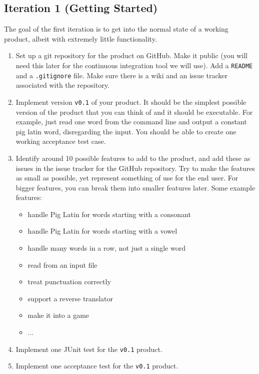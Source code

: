 \documentclass[swedish,english]{article}
\begin{document}
\subsection*{Iteration 1 (Getting Started)}
The goal of the first iteration is to get into the normal state of a working product, albeit with extremely little functionality.

\begin{enumerate}

\item Set up a git repository for the product on GitHub. Make it public (you will need this later for the continuous integration tool we will use). Add a \verb'README' and a \verb'.gitignore' file. Make sure there is a wiki and an issue tracker associated with the repository.

\item Implement version \verb'v0.1' of your product. It should be the simplest possible version of the product that you can think of and it should be executable. For example, just read one word from the command line and output a constant pig latin word, disregarding the input. You should be able to create one working acceptance test case.

\item Identify around 10 possible features to add to the product, and add these as issues in the issue tracker for the GitHub repository. Try to make the features as small as possible, yet represent something of use for the end user. For bigger features, you can break them into smaller features later. Some example features:
\begin{itemize}
\item handle Pig Latin for words starting with a consonant
\item handle Pig Latin for words starting with a vowel
\item handle many words in a row, not just a single word
\item read from an input file
\item treat punctuation correctly
\item support a reverse translator
\item make it into a game
\item ...
\end{itemize}

\item Implement one JUnit test for the \verb'v0.1'  product.

\item Implement one acceptance test for the \verb'v0.1'  product.


\end{enumerate}
\end{document}
